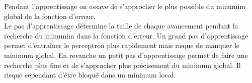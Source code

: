 \documentclass[twoside,openright,a4paper,11pt,french]{article}
\begin{document}
Pendant l'apprentissage on essaye de s'approcher le plus possible du minumim
global de la fonction d'erreur.\\

Le pas d'apprentissage détermine la taille de chaque avancement pendant la
recherche du minumim dans la fonction d'erreur.  Un grand pas d'apprentissage
permet d'entraîner le perceptron plus rapidement mais risque de manquer le
minimum global. En revanche un petit pas d'apprentissage permet de faire une
recherche plus fine et de s'approcher plus précisement du minimum global. Il
risque cependant d'être bloqué dans un minimum local.\\






\end{document}
